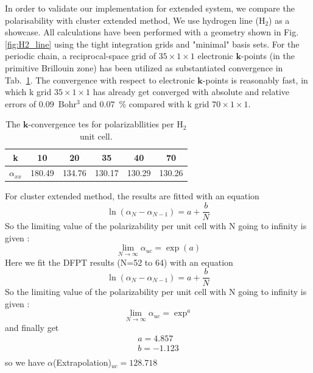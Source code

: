 {In order to validate our implementation for extended system,
we compare the polarisability with cluster extended method,
We use hydrogen line (H$_2$) as a showcase. All calculations have been performed with a geometry shown in Fig.\ref{fig:H2_line} using the tight integration grids and "minimal" basis sets. For the periodic chain, a reciprocal-space
grid of $35 \times 1 \times 1$ electronic $\mathbf{k}$-points (in the primitive Brillouin zone) has been utilized as substantiated convergence in Tab.~\ref{tab:k_convergence_for_H2_line}. The convergence with respect to electronic $\mathbf{k}$-points is reasonably fast, in which k grid $35 \times 1 \times 1$ has already get converged with absolute 
and relative errors of $0.09$~Bohr$^{3}$ and $0.07$~\% compared with k grid $70 \times 1 \times 1$. 

\begin{table}
\begin{tabular}{c|c c c cc }
\hline \hline
k & 10 & 20 & 35 &  40 & 70 \\
\hline
$\alpha_{xx}$  & 180.49 & 134.76  &  130.17 & 130.29 & 130.26\\
\hline \hline
\end{tabular}
\caption{The $\mathbf{k}$-convergence tes for polarizabllities per H$_2$ unit cell.}
\label{tab:k_convergence_for_H2_line}
\end{table}

For cluster extended method, the results are fitted with an equation
\begin{equation}
\ln{(\alpha_N-\alpha_{N-1})}=a+\dfrac{b}{N}
\end{equation}
So the limiting value of the polarizability per unit cell with N going to infinity is given :
\begin{equation}
\lim_{N\rightarrow \infty}{\alpha_{uc}} = \exp(a)
\end{equation}
Here we fit the  DFPT results (N=52 to 64) with an equation
\begin{equation}
\ln{(\alpha_N-\alpha_{N-1})}=a+\dfrac{b}{N}
\end{equation}
So the limiting value of the polarizability per unit cell with N going to infinity is given :
\begin{equation}
\lim_{N\rightarrow \infty}{\alpha_{uc}} = \exp^{a}
\end{equation}
and finally get 
\begin{align}
a=4.857 \\
b=-1.123 \\
\end{align}
so we have $\alpha$(Extrapolation)$_{uc}=128.718$

}
